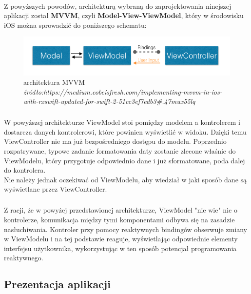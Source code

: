 \documentclass[12pt,oneside,a4paper]{report}
\begin{document}
\paragraph{}Z powyższych powodów, architekturą wybraną do zaprojektowania ninejszej aplikacji został \textbf{MVVM}, czyli \textbf{Model-View-ViewModel}, który w środowisku iOS można sprowadzić do poniższego schematu:
  	\begin{figure}[ht!]
  	\centering
  	\includegraphics[width=13cm]{rxMVVM}
  	\caption{architektura MVVM
  		\textit{źródło:https://medium.cobeisfresh.com/implementing-mvvm-in-ios-with-rxswift-updated-for-swift-2-51cc3ef7edb3\#.47mux55lq}}
  	\label{rxMVVM}
  \end{figure}
\subparagraph{}W powyższej architekturze ViewModel stoi pomiędzy modelem a kontrolerem i dostarcza danych kontrolerowi, które powinien wyświetlić w widoku. Dzięki temu ViewController nie ma już bezpośredniego dostępu do modelu. Poprzednio rozpatrywane, typowe zadanie formatowania daty zostanie zlecone właśnie do ViewModelu, który przygotuje odpowiednio dane i już sformatowane, poda dalej do kontrolera.
\\Nie należy jednak oczekiwać od ViewModelu, aby wiedział w jaki sposób dane są wyświetlane przez ViewController. 
\subparagraph{}Z racji, że w powyżej przedstawionej architekturze, ViewModel "nie wie" nic o kontrolerze, komunikacja między tymi komponentami odbywa się na zasadzie nasłuchiwania. Kontroler przy pomocy reaktywnych bindingów obserwuje zmiany w ViewModelu i na tej podstawie reaguje, wyświetlając odpowiednie elementy interfejsu użytkownika, wykorzystując w ten sposób potencjał programowania reaktywnego. 
\pagebreak
\subsection{Prezentacja aplikacji}
\end{document}
